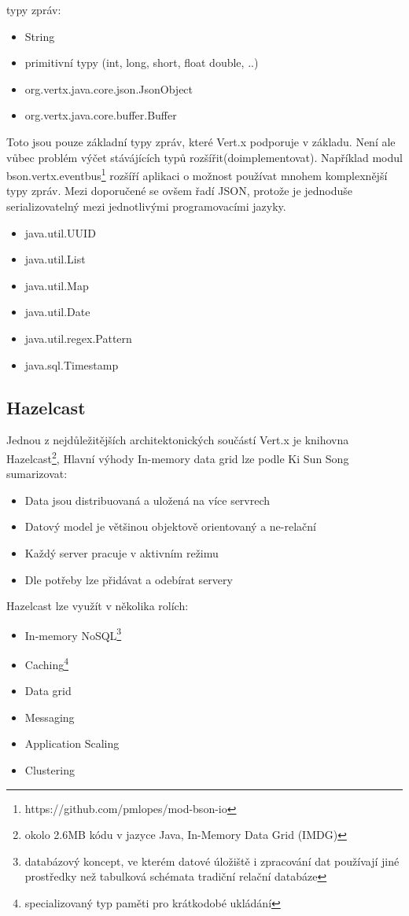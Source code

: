 typy zpráv:
\begin{itemize}
\item{String}
\item{primitivní typy (int, long, short, float double, ..)}
\item{org.vertx.java.core.json.JsonObject}
\item{org.vertx.java.core.buffer.Buffer}
\end{itemize}

Toto jsou pouze základní typy zpráv, které Vert.x podporuje v základu. Není ale vůbec problém výčet stávájících typů rozšířit(doimplementovat). Například modul bson.vertx.eventbus\footnote{https://github.com/pmlopes/mod-bson-io} rozšíří aplikaci o možnost používat mnohem komplexnější typy zpráv. Mezi doporučené se ovšem řadí JSON, protože je jednoduše serializovatelný mezi jednotlivými programovacími jazyky.
\begin{itemize}
\item{java.util.UUID}
\item{java.util.List}
\item{java.util.Map}
\item{java.util.Date}
\item{java.util.regex.Pattern}
\item{java.sql.Timestamp}
\end{itemize}

\subsection{Hazelcast}

Jednou z nejdůležitějších architektonických součástí Vert.x je knihovna Hazelcast\footnote{okolo 2.6MB kódu v jazyce Java, In-Memory Data Grid (IMDG)}, Hlavní výhody In-memory data grid\cite{inMemoryDataGrid} lze podle Ki Sun Song sumarizovat:
\begin{itemize}
\item{Data jsou distribuovaná a uložená na více servrech }
\item{Datový model je většinou objektově orientovaný a ne-relační}
\item{Každý server pracuje v aktivním režimu}
\item{Dle potřeby lze přidávat a odebírat servery}
\end{itemize}

Hazelcast lze využít v několika rolích:
\begin{itemize}
\item{In-memory NoSQL\footnote{databázový koncept, ve kterém datové úložiště i zpracování dat používají jiné prostředky než tabulková schémata tradiční relační databáze}}
\item{Caching\footnote{specializovaný typ paměti pro krátkodobé ukládání}}
\item{Data grid}
\item{Messaging}
\item{Application Scaling}
\item{Clustering}
\end{itemize}

